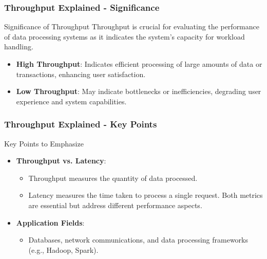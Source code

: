 \documentclass[aspectratio=169]{beamer}
\begin{document}
\begin{frame}[fragile]
    \frametitle{Throughput Explained - Significance}
    \begin{block}{Significance of Throughput}
        Throughput is crucial for evaluating the performance of data processing systems as it indicates the system's capacity for workload handling.
        
        \begin{itemize}
            \item \textbf{High Throughput}: Indicates efficient processing of large amounts of data or transactions, enhancing user satisfaction.
            \item \textbf{Low Throughput}: May indicate bottlenecks or inefficiencies, degrading user experience and system capabilities.
        \end{itemize}
    \end{block}
\end{frame}

\begin{frame}[fragile]
    \frametitle{Throughput Explained - Key Points}
    \begin{block}{Key Points to Emphasize}
        \begin{itemize}
            \item \textbf{Throughput vs. Latency}: 
                \begin{itemize}
                    \item Throughput measures the quantity of data processed.
                    \item Latency measures the time taken to process a single request. Both metrics are essential but address different performance aspects.
                \end{itemize}
            \item \textbf{Application Fields}: 
                \begin{itemize}
                    \item Databases, network communications, and data processing frameworks (e.g., Hadoop, Spark).
                \end{itemize}
        \end{itemize}
    \end{block}
\end{frame}
\end{document}
